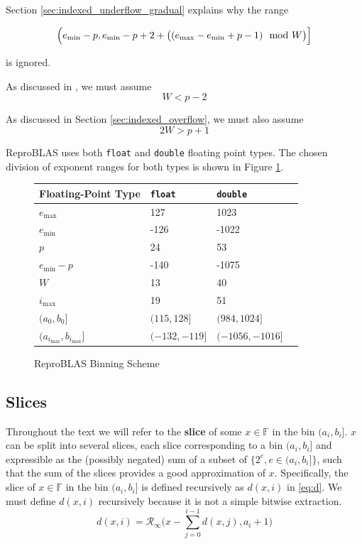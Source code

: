 \documentclass[12pt]{article}
\providecommand{\F}{\ensuremath{\mathbb{F}}}
\providecommand{\min}{\ensuremath{\text{min}}}
\providecommand{\max}{\ensuremath{\text{max}}}
\providecommand{\roundtonearestinfty}{\ensuremath{\mathcal{R}_\text{$\infty$}}}
\theoremstyle{definition}
\numberwithin{equation}{section}
\numberwithin{figure}{section}
\begin{document}
    Section \ref{sec:indexed_underflow_gradual} explains why the range

    \begin{equation*}
    \Bigl(e_{\min} - p, e_{\min} - p + 2 + \bigl((e_{\max} - e_{\min} + p - 1) \mod W\bigr)\Bigr]
    \end{equation*}

    is ignored.

    As discussed in \cite{repsum}, we must assume
    \begin{equation}
      W < p - 2
      \label{eq:wupper}
    \end{equation}

    As discussed in Section \ref{sec:indexed_overflow}, we must also assume
    \begin{equation}
      2 W > p + 1
      \label{eq:wlower}
    \end{equation}

    ReproBLAS uses both \texttt{float} and \texttt{double} floating point types. The chosen division of exponent ranges for both types is shown in Figure \ref{fig:bins}.
    \begin{figure}[H] \centering\begin{tabular}{ | l | l | l | p{5cm} |} \hline Floating-Point Type & \texttt{float} & \texttt{double}\\ \hline $e_{\max}$ & 127 & 1023\\ \hline $e_{\min}$ &  -126 & -1022 \\ \hline $p$ & 24 & 53 \\ \hline $e_{\min} - p$ & -140 & -1075 \\ \hline $W$ & 13 & 40 \\ \hline $i_{\max}$ & 19 & 51 \\ \hline $(a_0, b_0]$ & $(115, 128]$ & $(984, 1024]$\\ \hline $(a_{i_{\max}}, b_{i_{\max}}]$ & $(-132, -119]$ & $(-1056, -1016]$ \\ \hline\end{tabular} \caption{ReproBLAS Binning Scheme}\label{fig:bins}\end{figure}

  \subsection{Slices}
    \label{sec:binning_slices}
    Throughout the text we will refer to the \textbf{slice} of some $x \in \F$ in the bin $(a_i, b_i]$. $x$ can be split into several slices, each slice corresponding to a bin $(a_i, b_i]$ and expressible as the (possibly negated) sum of a subset of $\{2^e, e \in (a_i, b_i]\}$, such that the sum of the slices provides a good approximation of $x$. Specifically, the slice of $x \in \F$ in the bin $(a_i, b_i]$ is defined recursively as $d(x, i)$ in \eqref{eq:d}. We must define $d(x, i)$ recursively because it is not a simple bitwise extraction.
    \begin{equation}
      d(x, i) = \roundtonearestinfty\bigl(x - \sum\limits_{j=0}^{i - 1}d(x,j), a_i + 1\bigr)
      \label{eq:d}
    \end{equation}
\end{document}
